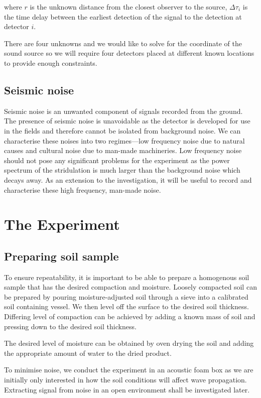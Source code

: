 \documentclass[twocolumn]{article}
\begin{document}
where $r$ is the unknown distance from the closest observer to the source, $\Delta\tau_i$ is the time delay between the earliest detection of the signal to the detection at detector $i$.

There are four unknowns and we would like to solve for the coordinate of the sound source so we will require four detectors placed at different known locations to provide enough constraints.

\subsection{Seismic noise}
Seismic noise is an unwanted component of signals recorded from the ground. The presence of seismic noise is unavoidable as the detector is developed for use in the fields and therefore cannot be isolated from background noise. We can characterise these noises into two regimes---low frequency noise due to natural causes and cultural noise due to man-made machineries. Low frequency noise should not pose any significant problems for the experiment as the power spectrum of the stridulation is much larger than the background noise which decays away. As an extension to the investigation, it will be useful to record and characterise these high frequency, man-made noise.

\section{The Experiment}
\subsection{Preparing soil sample}
To ensure repeatability, it is important to be able to prepare a homogenous soil sample that has the desired compaction and moisture. Loosely compacted soil can be prepared by pouring moisture-adjusted soil through a sieve into a calibrated soil containing vessel. We then level off the surface to the desired soil thickness. Differing level of compaction can be achieved by adding a known mass of soil and pressing down to the desired soil thickness.

The desired level of moisture can be obtained by oven drying the soil and adding the appropriate amount of water to the dried product.

To minimise noise, we conduct the experiment in an acoustic foam box as we are initially only interested in how the soil conditions will affect wave propagation. Extracting signal from noise in an open environment shall be investigated later.
\end{document}
